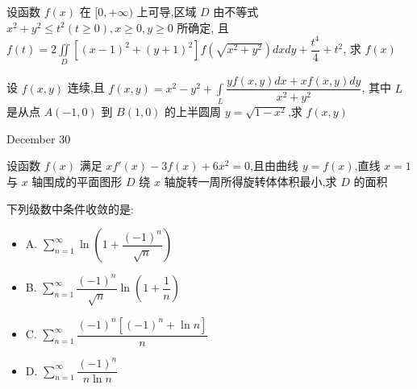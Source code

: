 \begin{solution}
	
\end{solution}

\begin{example}[][Exam: 38.4.17]
	设函数 $f(x)$ 在 $[0,+\infty)$ 上可导,区域 $D$ 由不等式 $x^{2}+y^{2}\leq t^{2}(t\geq 0),x\geq 0,y\geq 0$ 所确定,
且 $\displaystyle{f(t)=2\iint\limits_{D}[(x-1)^{2}+(y+1)^{2}]f(\sqrt{x^{2}+y^{2}})dxdy+\dfrac{t^{4}}{4}+t^{2}}$, 求 $f(x)$
\end{example}

\begin{solution}
	
\end{solution}

\begin{example}[][Exam: 38.4.18]
	设 $f(x,y)$ 连续,且 $\displaystyle{f(x,y)=x^{2}-y^{2}+\int\limits_{L}\dfrac{yf(x,y)dx+xf(x,y)dy}{x^{2}+y^{2}}}$,
	其中 $L$ 是从点 $A(-1,0)$ 到 $B(1,0)$ 的上半圆周 $y=\sqrt{1-x^{2}}$,求 $f(x,y)$
\end{example}

\begin{solution}
	
\end{solution}


\textcolor{purplea}{December 30}

\begin{example}[][Exam: 38.4.19]
	设函数 $f(x)$ 满足 $xf'(x)-3f(x)+6x^{2}=0$,且由曲线 $y=f(x)$,直线 $x=1$ 与 $x$ 轴围成的平面图形 $D$ 绕 $x$ 轴旋转一周所得旋转体体积最小,求 $D$ 的面积
\end{example}

\begin{solution}
	
\end{solution}

\begin{example}[][Exam: 38.4.20]
	下列级数中条件收敛的是:
\begin{itemize}
	\item A. $\sum\limits_{n=1}^{\infty}\ln(1+\dfrac{(-1)^{n}}{\sqrt{n}})$
	\item B. $\sum\limits_{n=1}^{\infty}\dfrac{(-1)^{n}}{\sqrt{n}}\ln(1+\dfrac{1}{n})$
	\item C. $\sum\limits_{n=1}^{\infty}\dfrac{(-1)^{n}[(-1)^{n}+\ln n]}{n}$
	\item D. $\sum\limits_{n=1}^{\infty}\dfrac{(-1)^{n}}{n\ln n}$
\end{itemize}
\end{example}


